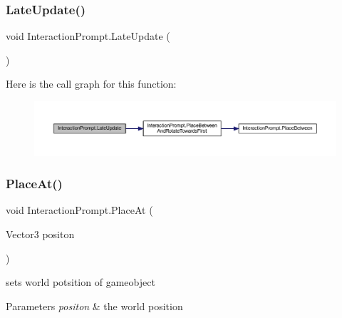 \subsubsection{\texorpdfstring{Late\+Update()}{LateUpdate()}}
{\footnotesize\ttfamily void Interaction\+Prompt.\+Late\+Update (\begin{DoxyParamCaption}{ }\end{DoxyParamCaption})\hspace{0.3cm}{\ttfamily [private]}}

Here is the call graph for this function\+:
\nopagebreak
\begin{figure}[H]
\begin{center}
\leavevmode
\includegraphics[width=350pt]{class_interaction_prompt_abdf8e29663a41a36dc2db027f3187c49_cgraph}
\end{center}
\end{figure}
\mbox{\label{class_interaction_prompt_affe2190bb7ca5e5476074dbbbb846b3c}} 
\subsubsection{\texorpdfstring{Place\+At()}{PlaceAt()}}
{\footnotesize\ttfamily void Interaction\+Prompt.\+Place\+At (\begin{DoxyParamCaption}\item[{Vector3}]{positon }\end{DoxyParamCaption})}



sets world potsition of gameobject 


\begin{DoxyParams}{Parameters}
{\em positon} & the world position\\
\hline
\end{DoxyParams}
\mbox{\label{class_interaction_prompt_a86cfcd9a578717260de54c04a51d6175}} 
